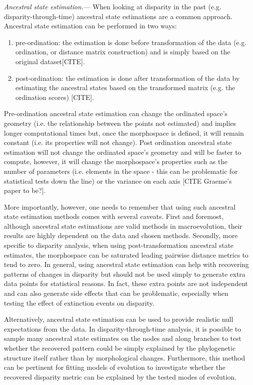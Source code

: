 \documentclass[12pt,letterpaper]{article}
\renewcommand{\subsubsection}[1]{%
\vspace{2ex}
\noindent
\textit{#1.}---}
\begin{document}
\subsubsection{Ancestral state estimation}
When looking at disparity in the past (e.g. disparity-through-time) ancestral state estimations are a common approach.
Ancestral state estimation can be performed in two ways:
\begin{enumerate}
\item pre-ordination: the estimation is done before transformation of the data (e.g. ordination, or distance matrix construction) and is simply based on the original dataset[CITE].
\item post-ordination: the estimation is done after transformation of the data by estimating the ancestral states based on the transformed matrix (e.g. the ordination scores) [CITE].
\end{enumerate}
Pre-ordination ancestral state estimation can change the ordinated space's geometry (i.e. the relationship between the points not estimated) and implies longer computational times but, once the morphospace is defined, it will remain constant (i.e. its properties will not change).
Post ordination ancestral state estimation will not change the ordinated space's geometry and will be faster to compute, however, it will change the morphospace's properties such as the number of parameters (i.e. elements in the space - this can be problematic for statistical tests down the line) or the variance on each axis [CITE Graeme's paper to be?].

More importantly, however, one needs to remember that using such ancestral state estimation methods comes with several caveats.
First and foremost, although ancestral state estimations are valid methods in macroevolution, their results are highly dependent on the data and chosen methods.
Secondly, more specific to disparity analysis, when using post-transformation ancestral state estimates, the morphospace can be saturated leading pairwise distance metrics to tend to zero.
In general, using ancestral state estimation can help with recovering patterns of changes in disparity but should not be used simply to generate extra data points for statistical reasons.
In fact, these extra points are not independent and can also generate side effects that can be problematic, especially when testing the effect of extinction events on disparity.

Alternatively, ancestral state estimation can be used to provide realistic null expectations from the data.
In disparity-through-time analysis, it is possible to sample many ancestral state estimates on the nodes and along branches to test whether the recovered pattern could be simply explained by the phylogenetic structure itself rather than by morphological changes.
Furthermore, this method can be pertinent for fitting models of evolution to investigate whether the recovered disparity metric can be explained by the tested modes of evolution.
\end{document}
